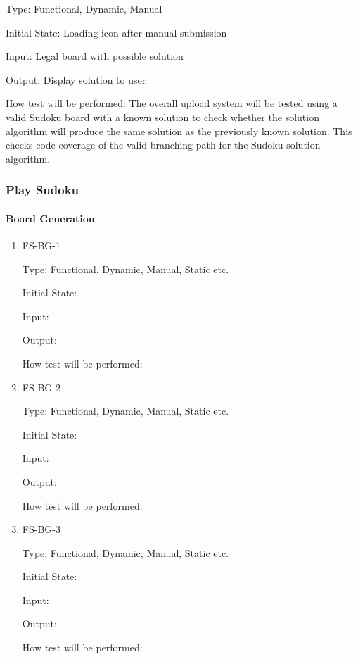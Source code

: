 \documentclass[11pt]{article}
\begin{document}
\begin{enumerate}
Type: Functional, Dynamic, Manual
					
Initial State: Loading icon after manual submission
					
Input: Legal board with possible solution
					
Output: Display solution to user
					
How test will be performed: The overall upload system will be tested using a valid Sudoku board with a known solution to check whether the solution algorithm will produce the same solution as the previously known solution. This checks code coverage of the valid branching path for the Sudoku solution algorithm.

\end{enumerate}

\subsubsection{Play Sudoku}

\paragraph{Board Generation}

\begin{enumerate}

\item{FS-BG-1\\}

Type: Functional, Dynamic, Manual, Static etc.
					
Initial State: 
					
Input: 
					
Output: 
					
How test will be performed: 
					
\item{FS-BG-2\\}

Type: Functional, Dynamic, Manual, Static etc.
					
Initial State: 
					
Input: 
					
Output: 
					
How test will be performed: 

\item{FS-BG-3\\}

Type: Functional, Dynamic, Manual, Static etc.
					
Initial State: 
					
Input: 
					
Output: 
					
How test will be performed: 

\end{enumerate}
\end{document}
